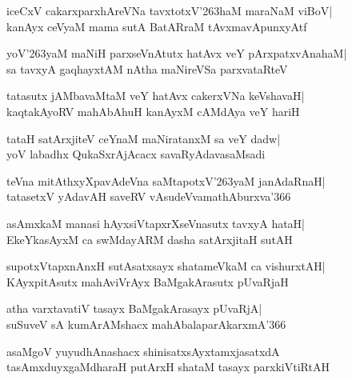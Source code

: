 \documentclass[twoside,12pt,openright]{book}
\def\S{\char'263}
\newcounter{shloka}[chapter]
\begin{document}
\begin{shloka}%
iceCxV cakarxparxhAreVNa tavxtotxV\S haM maraNaM viBoV|\\
kanAyx ceVyaM mama sutA BatARraM tAvxmavApunxyAtf
\end{shloka}

\begin{shloka}%
yoV\S yaM maNiH parxseVnAtutx hatAvx veY pArxpatxvAnahaM|\\
sa tavxyA gaqhayxtAM nAtha maNireVSa parxvataRteV
\end{shloka}

\begin{shloka}%
tatasutx jAMbavaMtaM veY hatAvx cakerxVNa keVshavaH|\\
kaqtakAyoRV mahAbAhuH kanAyxM cAMdAya veY hariH
\end{shloka}

\begin{shloka}%
tataH satArxjiteV ceYnaM maNiratanxM sa veY dadw|\\
yoV labadhx QukaSxrAjAcacx savaRyAdavasaMsadi
\end{shloka}

\begin{shloka}%
teVna mitAthxyXpavAdeVna saMtapotxV\S yaM janAdaRnaH|\\
tatasetxV yAdavAH saveRV vAsudeVvamathAburxva\char'366
\end{shloka}

\begin{shloka}%
asAmxkaM manasi hAyxsiVtapxrXseVnasutx tavxyA hataH|\\
EkeYkasAyxM ca swMdayARM dasha satArxjitaH sutAH
\end{shloka}

\begin{shloka}%
supotxVtapxnAnxH sutAsatxsayx shatameVkaM ca vishurxtAH|\\
KAyxpitAsutx mahAviVrAyx BaMgakArasutx pUvaRjaH
\end{shloka}

\begin{shloka}%
atha varxtavatiV tasayx BaMgakArasayx pUvaRjA|\\
suSuveV sA kumArAMshacx mahAbalaparAkarxmA\char'366
\end{shloka}

\begin{shloka}%
asaMgoV yuyudhAnashacx shinisatxsAyxtamxjasatxdA\\
tasAmxduyxgaMdharaH putArxH shataM tasayx parxkiVtiRtAH
\end{shloka}
\end{document}
